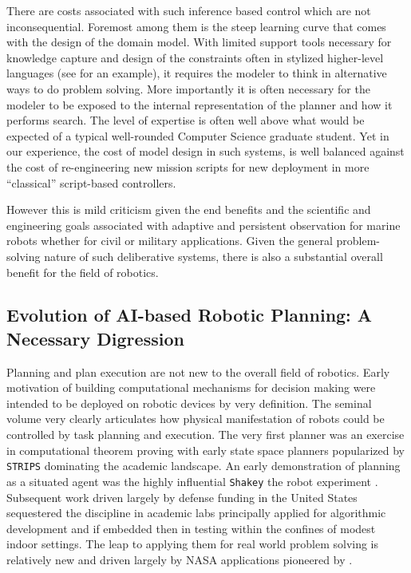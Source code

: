 There are costs associated with such inference based control which are
not inconsequential. Foremost among them is the steep learning curve
that comes with the design of the domain model. With limited support
tools necessary for knowledge capture and design of the constraints
often in stylized higher-level languages (see \cite{NDDL} for an
example), it requires the modeler to think in alternative ways to do
problem solving. More importantly it is often necessary for the
modeler to be exposed to the internal representation of the planner
and how it performs search. The level of expertise is often well above
what would be expected of a typical well-rounded Computer Science
graduate student. Yet in our experience, the cost of model design in
such systems, is well balanced against the cost of re-engineering new
mission scripts for new deployment in more ``classical'' script-based
controllers.

However this is mild criticism given the end benefits and the
scientific and engineering goals associated with adaptive and
persistent observation for marine robots whether for civil or military
applications. Given the general problem-solving nature of such
deliberative systems, there is also a substantial overall benefit for
the field of robotics. 

\subsection{Evolution of AI-based Robotic Planning: A Necessary Digression}

Planning and plan execution are not new to the overall field of
robotics. Early motivation of building computational mechanisms for
decision making were intended to be deployed on robotic devices by
very definition. The seminal volume \cite{computersthought} very
clearly articulates how physical manifestation of robots could be
controlled by task planning and execution. The very first planner
\cite{green69} was an exercise in computational theorem proving with
early state space planners popularized by \texttt{STRIPS}
\cite{strips71} dominating the academic landscape. An early
demonstration of planning as a situated agent was the highly
influential \texttt{Shakey} the robot experiment
\cite{shakey84}. Subsequent work driven largely by defense funding in
the United States sequestered the discipline in academic labs
principally applied for algorithmic development and if embedded then
in testing within the confines of modest indoor settings. The leap to
applying them for real world problem solving is relatively new and
driven largely by NASA applications pioneered by \cite{mus94,mus98,
  jonsson00, rajan00, chien05, bresina05}.

